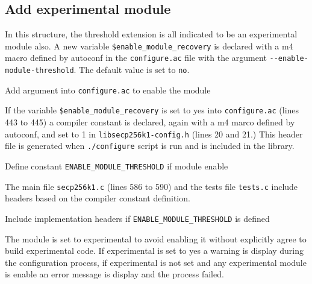 \subsection{Add experimental module}

In this structure, the threshold extension is all indicated to be an experimental
module also. A new variable \texttt{\$enable\_module\_recovery} is declared
with a m4 macro defined by autoconf in the
\texttt{configure.ac} file with the argument \texttt{-{}-enable-module-threshold}.
The default value is set to \texttt{no}.

\begin{listing}
	\caption{Add argument into \texttt{configure.ac} to enable the module}
	\label{lst:configureEnableThreshold}
\end{listing}

If the variable \texttt{\$enable\_module\_recovery} is set to yes into \texttt{configure.ac}
(lines 443 to 445) a compiler constant is declared, again with a m4 marco defined by
autoconf, and set to 1 in \texttt{libsecp256k1-config.h}
(lines 20 and 21.) This header file is generated when \texttt{./configure} script is run and
is included in the library.

\begin{listing}
	\caption{Define constant \texttt{ENABLE\_MODULE\_THRESHOLD} if module enable}
	\label{lst:defineEnableThreshold}
\end{listing}

The main file \texttt{secp256k1.c} (lines 586 to 590) and the tests file \texttt{tests.c}
include headers based on the compiler constant definition.

\begin{listing}
	\caption{Include implementation headers if \texttt{ENABLE\_MODULE\_THRESHOLD} is
  defined}
	\label{lst:includeThresholdImplementationHeaders}
\end{listing}

The module is set to experimental to avoid enabling it without explicitly agree
to build experimental code. If experimental is set to yes a warning is display
during the configuration process, if experimental is not set and any experimental
module is enable an error message is display and the process failed.

